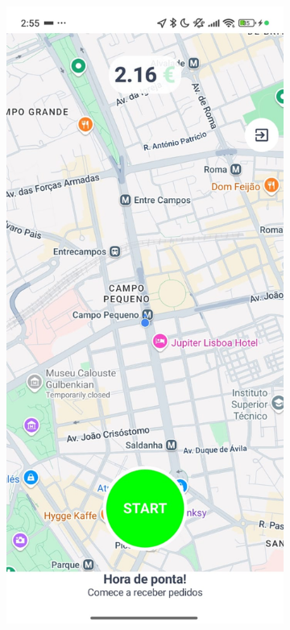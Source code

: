 \begin{figure}[H]
    \centering
    \begin{subfigure}[b]{0.44\textwidth}
        \centering
        \includegraphics[width=\textwidth]{images/go_screen.jpeg}

\end{subfigure}
\end{figure}
